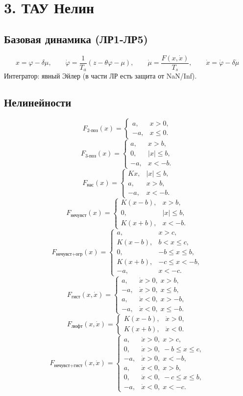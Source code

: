 \documentclass[12pt,a4paper]{article}
\begin{document}
\section*{3. ТАУ Нелин}

\subsection*{Базовая динамика (ЛР1-ЛР5)}
\[
x=\varphi-\delta\mu,\qquad
\dot{\varphi}=\frac{1}{T_a}(z-\theta\varphi-\mu),\qquad
\dot{\mu}=\frac{F(x,\dot{x})}{T_s},\qquad
\dot{x}=\dot{\varphi}-\delta\dot{\mu}
\]
Интегратор: явный Эйлер (в части ЛР есть защита от NaN/Inf).

\subsection*{Нелинейности}
\[
F_{\text{2-поз}}(x)=
\begin{cases}
a, & x>0,\\
-a, & x\le 0.
\end{cases}
\]
\[
F_{\text{3-поз}}(x)=
\begin{cases}
a, & x>b,\\
0, & |x|\le b,\\
-a, & x<-b.
\end{cases}
\]
\[
F_{\text{нас}}(x)=
\begin{cases}
Kx, & |x|\le b,\\
a, & x>b,\\
-a, & x<-b.
\end{cases}
\]
\[
F_{\text{нечувст}}(x)=
\begin{cases}
K(x-b), & x>b,\\
0, & |x|\le b,\\
K(x+b), & x<-b.
\end{cases}
\]
\[
F_{\text{нечувст+огр}}(x)=
\begin{cases}
a, & x>c,\\
K(x-b), & b<x\le c,\\
0, & -b\le x\le b,\\
K(x+b), & -c\le x<-b,\\
-a, & x<-c.
\end{cases}
\]
\[
F_{\text{гист}}(x,\dot{x})=
\begin{cases}
a, & \dot{x}>0,\;x>b,\\
-a, & \dot{x}>0,\;x\le b,\\
a, & \dot{x}<0,\;x>-b,\\
-a, & \dot{x}<0,\;x\le -b.
\end{cases}
\]
\[
F_{\text{люфт}}(x,\dot{x})=
\begin{cases}
K(x-b), & \dot{x}>0,\\
K(x+b), & \dot{x}<0.
\end{cases}
\]
\[
F_{\text{нечувст+гист}}(x,\dot{x})=
\begin{cases}
a, & \dot{x}>0,\;x>c,\\
0, & \dot{x}>0,\;-b\le x\le c,\\
-a, & \dot{x}>0,\;x<-b,\\
a, & \dot{x}<0,\;x>b,\\
0, & \dot{x}<0,\;-c\le x\le b,\\
-a, & \dot{x}<0,\;x<-c.
\end{cases}
\]
\end{document}
